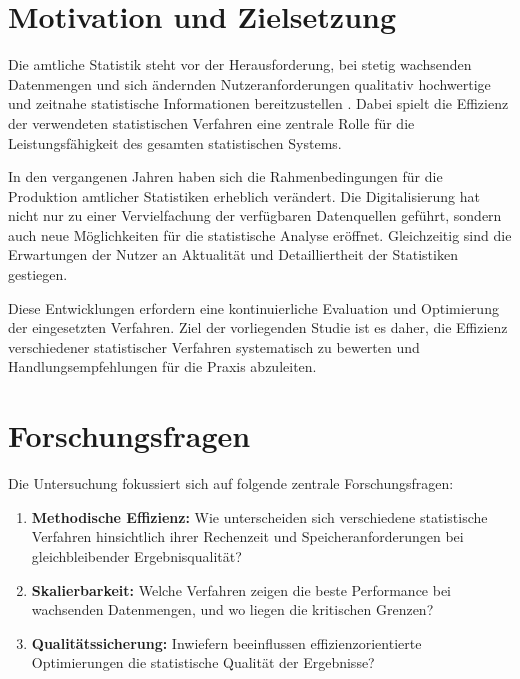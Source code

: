 \documentclass[
  ngerman,
  10pt,
  letterpaper,
  twocolumn]{book}
\begin{document}
\section*{Motivation und Zielsetzung}\label{motivation-und-zielsetzung}


Die amtliche Statistik steht vor der Herausforderung, bei stetig
wachsenden Datenmengen und sich ändernden Nutzeranforderungen qualitativ
hochwertige und zeitnahe statistische Informationen bereitzustellen
\autocite{destatis2023}. Dabei spielt die Effizienz der verwendeten
statistischen Verfahren eine zentrale Rolle für die Leistungsfähigkeit
des gesamten statistischen Systems.

In den vergangenen Jahren haben sich die Rahmenbedingungen für die
Produktion amtlicher Statistiken erheblich verändert. Die
Digitalisierung hat nicht nur zu einer Vervielfachung der verfügbaren
Datenquellen geführt, sondern auch neue Möglichkeiten für die
statistische Analyse eröffnet. Gleichzeitig sind die Erwartungen der
Nutzer an Aktualität und Detailliertheit der Statistiken gestiegen.

Diese Entwicklungen erfordern eine kontinuierliche Evaluation und
Optimierung der eingesetzten Verfahren. Ziel der vorliegenden Studie ist
es daher, die Effizienz verschiedener statistischer Verfahren
systematisch zu bewerten und Handlungsempfehlungen für die Praxis
abzuleiten.

\section*{Forschungsfragen}\label{forschungsfragen}


Die Untersuchung fokussiert sich auf folgende zentrale Forschungsfragen:

\begin{enumerate}
\def\labelenumi{\arabic{enumi}.}
\item
  \textbf{Methodische Effizienz:} Wie unterscheiden sich verschiedene
  statistische Verfahren hinsichtlich ihrer Rechenzeit und
  Speicheranforderungen bei gleichbleibender Ergebnisqualität?
\item
  \textbf{Skalierbarkeit:} Welche Verfahren zeigen die beste Performance
  bei wachsenden Datenmengen, und wo liegen die kritischen Grenzen?
\item
  \textbf{Qualitätssicherung:} Inwiefern beeinflussen
  effizienzorientierte Optimierungen die statistische Qualität der
  Ergebnisse?
\end{enumerate}
\end{document}
